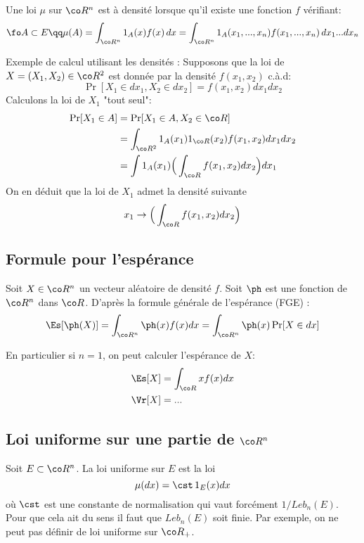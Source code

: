 \documentclass{article}
\begin{document}
Une loi $\mu$ sur $ \co R^n $ est à densité lorsque qu'il existe une fonction $f$ vérifiant:
$$
\fo A \subset E \qq  \mu(A) = \int_{\co R^n}  1_A(x)     f(x) \, dx =  \int_{\co R^n}  1_A(x_1,...,x_n)     f(x_1,...,x_n) \, dx_1 ... dx_n  
$$


Exemple de calcul utilisant les densités :  Supposons que la loi de $X=(X_1,X_2)\in \co R^2 $ est donnée par la densité $f(x_1,x_2)$ c.à.d: 
$$
\Pr[X_1 \in  dx_1 , X_2 \in dx_2] = f(x_1,x_2) dx_1 dx_2
$$
Calculons la loi de $X_1$ "tout seul":  
\begin{alignat*}{1}
\Pr[X_1 \in A]& =\Pr[X_1 \in  A , X_2 \in \co R] \\
&=    \int_{\co R^2} 1_A(x_1) 1_{\co R}(x_2)  f(x_1,x_2) dx_1 dx_2\\
&= \int 1_A(x_1)     \Big ( \int_{\co R} f(x_1,x_2)  dx_2 \Big) dx_1 
\end{alignat*}
On en déduit que la loi de $X_1$ admet la densité suivante  
$$
x_1 \to   \Big ( \int_{\co R} f(x_1,x_2)  dx_2 \Big)
$$



\subsection{Formule pour l'espérance}



Soit $X\in \co R^n$ un vecteur aléatoire de densité $f$.   Soit $\ph$ est une fonction de $\co R^n$ dans $\co R$.  D'après la  formule générale de l'espérance  (FGE) : 
\begin{equation*}
\Es[\ph(X)] = \int_{\co R^n}  \ph(x)  f(x) dx  =  \int_{\co R^n}  \ph(x) \Pr[X\in dx] 
\end{equation*}

En particulier si $n=1$,  on peut calculer l'espérance de $X$:
\begin{alignat*}{1}
\Es[X] &= \int_{\co R} x f(x) dx  \\
\Vr[X] &= ...
 \end{alignat*}




\subsection{Loi uniforme sur une partie de $\co R^n$}

Soit $E \subset \co R^n$. La loi uniforme sur $E$ est la loi 
$$
\mu(dx) =   \cst \, 1_{E} (x) dx  
$$  
où $\cst$ est une constante de normalisation qui vaut forcément   $1/ Leb_n(E) $.   Pour que cela ait du sens il faut que $Leb_n(E) $ soit finie. Par exemple, on ne peut pas définir de loi uniforme sur $\co R_+$. 
\end{document}

